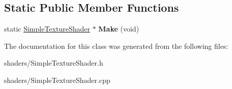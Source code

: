 \subsection*{\-Static \-Public \-Member \-Functions}
\begin{DoxyCompactItemize}
\item 
\hypertarget{classSimpleTextureShader_a84653790e0c6103c90a05094810e8fb4}{static \hyperlink{classSimpleTextureShader}{\-Simple\-Texture\-Shader} $\ast$ {\bfseries \-Make} (void)}\label{classSimpleTextureShader_a84653790e0c6103c90a05094810e8fb4}

\end{DoxyCompactItemize}


\-The documentation for this class was generated from the following files\-:\begin{DoxyCompactItemize}
\item 
shaders/\-Simple\-Texture\-Shader.\-h\item 
shaders/\-Simple\-Texture\-Shader.\-cpp\end{DoxyCompactItemize}
